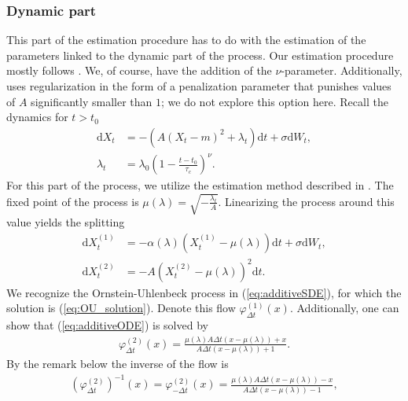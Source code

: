 \subsubsection{Dynamic part}\label{subsubsec:OUprocessDynamic}
This part of the estimation procedure has to do with the estimation of the parameters linked to the dynamic part of the process. Our estimation procedure mostly follows \cite{Ditlevsen2023}. We, of course, have the addition of the $\nu$-parameter. Additionally, \cite{Ditlevsen2023} uses regularization in the form of a penalization parameter that punishes values of $A$ significantly smaller than $1$; we do not explore this option here. Recall the dynamics for $t>t_0$
\begin{align}
    \mathrm{d}X_t &= -\left(A\left(X_t - m\right)^2 + \lambda_t\right)\mathrm{d}t + \sigma \mathrm{d}W_t \label{eq:additiveDynamicPart},\\
    \lambda_t &= \lambda_0\left(1 - \frac{t - t_0}{\tau_c}\right)^\nu.
\end{align}
For this part of the process, we utilize the estimation method described in \cite{DitlevsenSupplementary}. The fixed point of the process is $\mu\left(\lambda\right) = \sqrt{-\frac{\lambda_t}{A}}$. Linearizing the process around this value yields the splitting
\begin{align}
    \mathrm{d}X_t^{(1)} &= -\alpha\left(\lambda\right)\left(X_t^{(1)} - \mu\left(\lambda\right)\right)\mathrm{d}t + \sigma \mathrm{d}W_t, \label{eq:additiveSDE}\\
    \mathrm{d}X_t^{(2)} &= -A \left(X_t^{(2)} - \mu\left(\lambda\right)\right)^2\mathrm{d}t. \label{eq:additiveODE}
\end{align}
We recognize the Ornstein-Uhlenbeck process in (\ref{eq:additiveSDE}), for which the solution is (\ref{eq:OU_solution}). Denote this flow $\varphi_{\Delta t}^{(1)}(x)$. Additionally, one can show that (\ref{eq:additiveODE}) is solved by 
\begin{align}
    \varphi^{(2)}_{\Delta t}(x) = \frac{\mu\left(\lambda\right)A\Delta t\left(x - \mu\left(\lambda\right)\right) + x}{A\Delta t\left(x- \mu\left(\lambda\right)\right) + 1}.
\end{align}
By the remark below \cite[equation (9)]{SplittingSchemes} the inverse of the flow is
\begin{align}
    \left(\varphi^{(2)}_{\Delta t}\right)^{-1}(x) = \varphi^{(2)}_{-\Delta t}(x) = \frac{\mu\left(\lambda\right)A\Delta t\left(x - \mu\left(\lambda\right)\right) - x}{A\Delta t\left(x- \mu\left(\lambda\right)\right) - 1},
\end{align}
